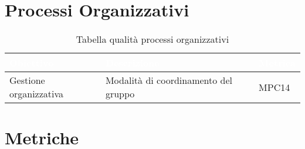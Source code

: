 \section{Processi Organizzativi}
\begin{table}[H]
  \renewcommand{\arraystretch}{1.25}
  \begin{tabular}{|p{2.5cm}|p{8cm}|p{1.7cm}|} \hline
    \rowcolor[HTML]{036400}
    \textcolor{white}{\textbf{Obiettivo}} & \textcolor{white}{\textbf{Descrizione}} & \textcolor{white}{\textbf{Metrica}}  \\ \hline
    \rowcolor[HTML]{EFEFEF}
    Gestione organizzativa & Modalità di coordinamento del gruppo & MPC14 \\ \hline
  \end{tabular}
  \caption{Tabella qualità processi organizzativi}
\end{table}

\section{Metriche}

